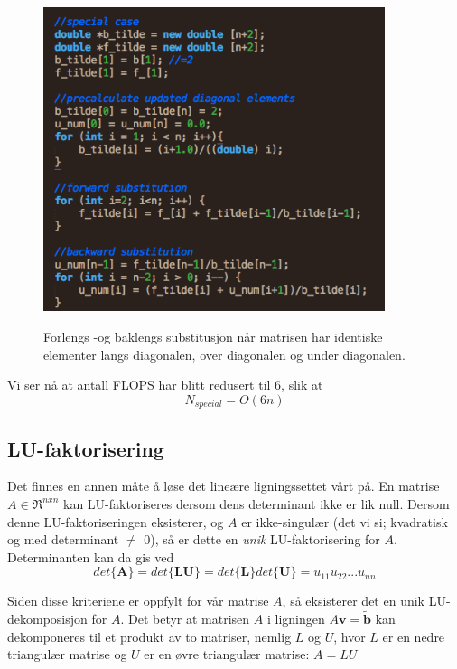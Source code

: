 \documentclass{article}
\begin{document}
\FloatBarrier
\begin{figure}[!ht]
  \begin{center}
  \includegraphics[width = 100mm]{simplified.png}\\
  \caption{Forlengs -og baklengs substitusjon når matrisen har identiske elementer langs diagonalen, over diagonalen og under diagonalen.}\label{fig:simplified}
  \end{center}
\end{figure}
\FloatBarrier

Vi ser nå at antall FLOPS har blitt redusert til 6, slik at 
\begin{equation}
N_{special} = O(6n)
\end{equation}


\subsection{LU-faktorisering}
Det finnes en annen måte å løse det lineære ligningssettet vårt på. En matrise $A \in \Re^{nxn}$ kan LU-faktoriseres dersom dens determinant ikke er lik null. Dersom denne LU-faktoriseringen eksisterer, og $A$ er ikke-singulær (det vi si; kvadratisk og med determinant $\not=$ 0), så er dette en \textit{unik} LU-faktorisering for $A$. Determinanten kan da gis ved
\begin{equation}
det\{\textbf{A}\} = det\{\textbf{LU}\} = det\{\textbf{L}\}det\{\textbf{U}\} = u_{11}u_{22}...u_{nn}
\end{equation}

Siden disse kriteriene er oppfylt for vår matrise $A$, så eksisterer det en unik LU-dekomposisjon for $A$. Det betyr at matrisen $A$ i ligningen $A\textbf{v}=\tilde{\textbf{b}}$ kan dekomponeres til et produkt av to matriser, nemlig $L$ og $U$, hvor $L$ er en nedre triangulær matrise og $U$ er en øvre triangulær matrise: $A=LU$
\end{document}
